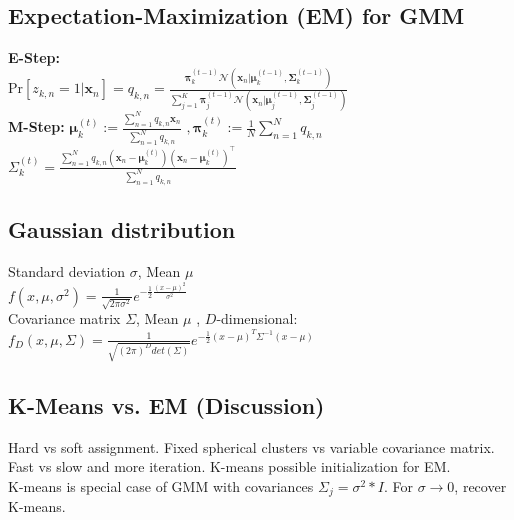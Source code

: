 \subsection*{Expectation-Maximization (EM) for GMM}
\textbf{E-Step: }\\
Pr$[z_{k,n} = 1 | \mathbf{x}_n] = q_{k, n} = \frac{\boldsymbol{\pi}_k^{(t-1)} \mathcal{N}(\mathbf{x}_n | \boldsymbol{\mu}_k^{(t-1)}, \boldsymbol{\Sigma}_k^{(t-1)})}{\sum_{j=1}^K \boldsymbol{\pi}_j^{(t-1)} \mathcal{N}(\mathbf{x}_n | \boldsymbol{\mu}_j^{(t-1)}, \boldsymbol{\Sigma}_j^{(t-1)})}$\\
\textbf{M-Step: } $\boldsymbol{\mu}_k^{(t)} := \frac{\sum_{n=1}^N q_{k,n} \mathbf{x}_n}{\sum_{n=1}^N q_{k,n}}$
$, \boldsymbol{\pi}_k^{(t)} := \frac{1}{N} \sum_{n=1}^N q_{k,n}$\\
$\Sigma_k^{(t)} = \frac{\sum_{n=1}^N q_{k, n} (\mathbf{x}_n - \boldsymbol{\mu}_k^{(t)})(\mathbf{x}_n - \boldsymbol{\mu}_k^{(t)})^\top}{\sum_{n=1}^N q_{k,n}}$

\subsection*{Gaussian distribution}
Standard deviation $\sigma$, Mean $\mu$ \\
$f(x,\mu, \sigma^2) = \frac{1}{\sqrt{2\pi \sigma^2}} e^{- \frac{1}{2} \frac{(x-\mu)^2}{\sigma^2}}$\\
Covariance matrix $\Sigma$, Mean $\mu$ , $D$-dimensional:\\
$f_D(x, \mu, \Sigma) = \frac{1}{\sqrt{(2\pi)^D det(\Sigma)}} e^{- \frac{1}{2} (x-\mu)^T \Sigma^{-1} (x-\mu)}$

\subsection*{K-Means vs. EM (Discussion)}
Hard vs soft assignment. Fixed spherical clusters vs variable covariance matrix. Fast vs slow and more iteration. K-means possible initialization for EM.\\
K-means is special case of GMM with covariances $\Sigma_j = \sigma^2 * I$. For $\sigma \rightarrow 0$, recover K-means.

